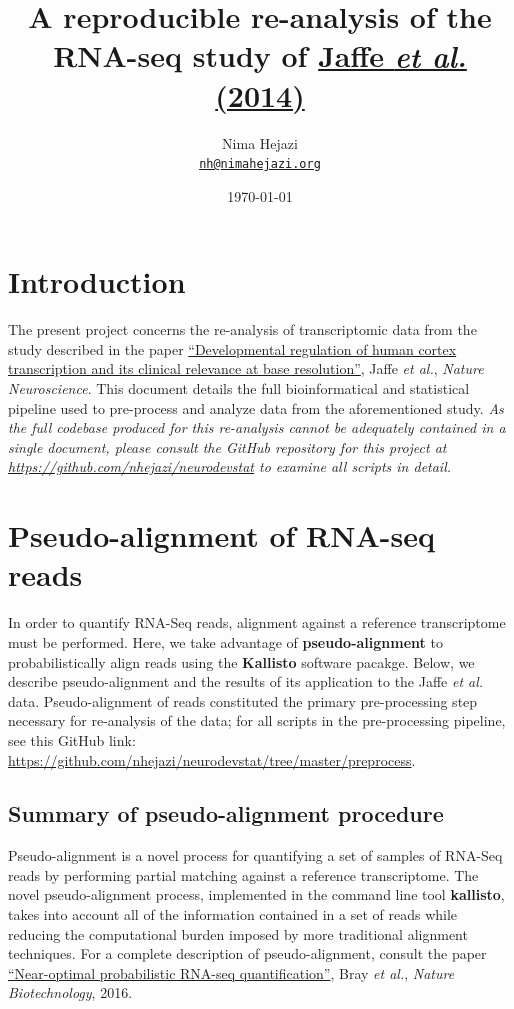 \documentclass[11pt]{article}
\title{A reproducible re-analysis of the RNA-seq study of
  \href{http://www.nature.com/neuro/journal/v18/n1/abs/nn.3898.html}{Jaffe
  \textit{et al.} (2014)}
}
\author{ Nima Hejazi \\
  \href{mailto:nh@nimahejazi.org}{\texttt{nh@nimahejazi.org}}
}
\date{\monthyeardate\today}
\begin{document}
\maketitle


\section{Introduction}
The present project concerns the re-analysis of transcriptomic data from the
study described in the paper
\href{http://www.nature.com/neuro/journal/v18/n1/abs/nn.3898.html}
{``Developmental regulation of human cortex transcription and its clinical
relevance at base resolution''}, Jaffe \textit{et al.}, \textit{Nature
Neuroscience}. This document details the full bioinformatical and statistical
pipeline used to pre-process and analyze data from the aforementioned study.
\textit{As the full codebase produced for this re-analysis cannot be adequately
contained in a single document, please consult the GitHub repository for this
project at \url{https://github.com/nhejazi/neurodevstat} to examine all scripts
in detail.}


\section{Pseudo-alignment of RNA-seq reads}
In order to quantify RNA-Seq reads, alignment against a reference transcriptome
must be performed. Here, we take advantage of \textbf{pseudo-alignment} to
probabilistically align reads using the \textbf{Kallisto} software pacakge.
Below, we describe pseudo-alignment and the results of its application to the
Jaffe \textit{et al.} data. Pseudo-alignment of reads constituted the primary
pre-processing step necessary for re-analysis of the data; for all scripts in
the pre-processing pipeline, see this GitHub link:
\url{https://github.com/nhejazi/neurodevstat/tree/master/preprocess}.


\subsection{Summary of pseudo-alignment procedure}
Pseudo-alignment is a novel process for quantifying a set of samples of RNA-Seq
reads by performing partial matching against a reference transcriptome. The
novel pseudo-alignment process, implemented in the command line tool
\textbf{kallisto}, takes into account all of the information contained in a set
of reads while reducing the computational burden imposed by more traditional
alignment techniques. For a complete description of pseudo-alignment, consult
the paper {\href{http://www.nature.com/nbt/journal/v34/n5/full/nbt.3519.html}
{``Near-optimal probabilistic RNA-seq quantification''}}, Bray \textit{et al.},
\textit{Nature Biotechnology}, 2016.
\end{document}

